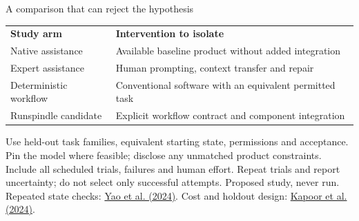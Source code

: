 \begin{frame}[label=argument-comparison]{A comparison that can reject the hypothesis}
\begin{tabular}{p{.30\linewidth}p{.61\linewidth}}
\textbf{Study arm} & \textbf{Intervention to isolate} \\
Native assistance & Available baseline product without added integration \\
Expert assistance & Human prompting, context transfer and repair \\
Deterministic workflow & Conventional software with an equivalent permitted task \\
Runspindle candidate & Explicit workflow contract and component integration \\
\end{tabular}
\par\medskip
Use held-out task families, equivalent starting state, permissions and acceptance.
Pin the model where feasible; disclose any unmatched product constraints.
Include all scheduled trials, failures and human effort. Repeat trials and
report uncertainty; do not select only successful attempts.
\vfill
{\footnotesize Proposed study, never run. Repeated state checks:
\href{https://arxiv.org/abs/2406.12045}{Yao et al. (2024)}.
Cost and holdout design: \href{https://arxiv.org/abs/2407.01502}{Kapoor et al. (2024)}.}
\end{frame}
